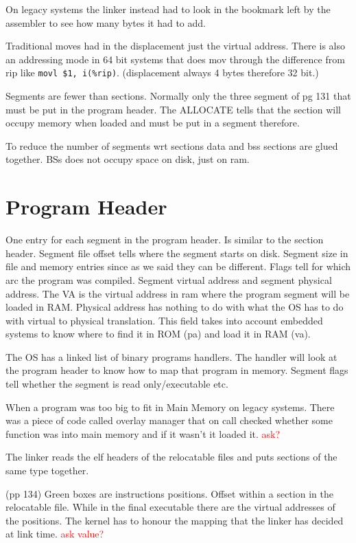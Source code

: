 \documentclass[twoside]{article}
\begin{document}
On legacy systems the linker instead had to look in the bookmark left by the
assembler to see how many bytes it had to add.

Traditional moves had in the displacement just the virtual address. There is
also an addressing mode in 64 bit systems that does mov through the difference
from rip like \texttt{movl \$1, i(\%rip)}. (displacement always 4 bytes
therefore 32 bit.)


Segments are fewer than sections. Normally only the three segment of pg 131 that
must be put in the program header. The ALLOCATE tells that the section will
occupy memory when loaded and must be put in a segment therefore.

To reduce the number of segments wrt sections data and bss sections are glued
together. BSs does not occupy space on disk, just on ram.


\section{Program Header}
\label{sec:Program Header}

One entry for each segment in the program header.
Is similar to the section header. Segment file offset tells where the segment
starts
on disk. Segment size in file and memory entries since as we said they can be
different. Flags tell for which arc the program was compiled. Segment virtual
address and segment physical address. The VA is the virtual address in ram where
the program segment will be loaded in RAM. Physical address has nothing to do
with what the OS has to do with virtual to physical translation. This field
takes into account embedded systems to know where to find it in ROM (pa) and
load it in RAM (va).

The OS has a linked list of binary programs handlers. The handler will look at
the program header to know how to map that program in memory. Segment flags tell
whether the segment is read only/executable etc.

\hline

When a program was too big to fit in Main Memory on legacy systems. There was a
piece of code called overlay manager that on call checked whether some function
was into main memory and if it wasn't it loaded it.
\textcolor{red}{ask?}
\hline


The linker reads the elf headers of the relocatable files and puts sections of
the same type together. 

(pp 134) Green boxes are instructions positions. Offset within a section in the
relocatable file. While
in the final executable there are the virtual addresses of the positions. The
kernel has to honour the mapping that the linker has decided at link time.
\textcolor{red}{ask value?}
\end{document}
